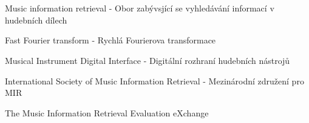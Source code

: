 \cleardoublepage
\chapter*{\listofabbrevname}
{}

\begin{acronym}[KolikMista]
		{Music information retrieval - Obor zabývsjící se vyhledávání informací v hudebních dílech}

		{Fast Fourier transform - Rychlá Fourierova transformace}
	
		{Musical Instrument Digital Interface - Digitální rozhraní hudebních nástrojů}

		{International Society of Music Information Retrieval - Mezinárodní združení pro \acs*{MIR}}	

		{The Music Information Retrieval Evaluation eXchange}	
	\end{acronym}

